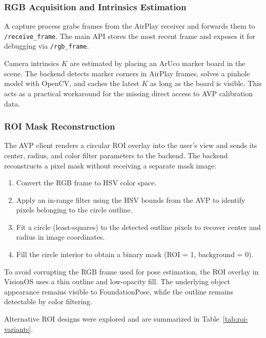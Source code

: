 \subsubsection{RGB Acquisition and Intrinsics Estimation}

A capture process grabs frames from the AirPlay receiver and forwards them to \texttt{/receive\_frame}. The main API stores the most recent frame and exposes it for debugging via \texttt{/rgb\_frame}.  

Camera intrinsics $K$ are estimated by placing an ArUco marker board in the scene. The backend detects marker corners in AirPlay frames, solves a pinhole model with OpenCV, and caches the latest $K$ as long as the board is visible. This acts as a practical workaround for the missing direct access to AVP calibration data.

\subsubsection{ROI Mask Reconstruction}

The AVP client renders a circular ROI overlay into the user’s view and sends its center, radius, and color filter parameters to the backend. The backend reconstructs a pixel mask without receiving a separate mask image:

\begin{enumerate}
    \item Convert the RGB frame to HSV color space.
    \item Apply an in-range filter using the HSV bounds from the AVP to identify pixels belonging to the circle outline.
    \item Fit a circle (least-squares) to the detected outline pixels to recover center and radius in image coordinates.
    \item Fill the circle interior to obtain a binary mask (ROI = 1, background = 0).
\end{enumerate}

To avoid corrupting the RGB frame used for pose estimation, the ROI overlay in VisionOS uses a thin outline and low-opacity fill. The underlying object appearance remains visible to FoundationPose, while the outline remains detectable by color filtering.

Alternative ROI designs were explored and are summarized in Table~\ref{tab:roi-variants}.


